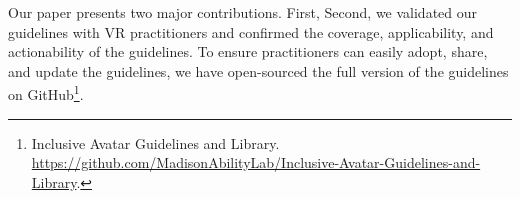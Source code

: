Our paper presents two major contributions. First,  %
Second, we validated  our guidelines with VR practitioners and confirmed the coverage, applicability, and actionability of the guidelines. 
To ensure practitioners can easily adopt, share, and update the guidelines, we have open-sourced the full version of the guidelines on GitHub\footnote{Inclusive Avatar Guidelines and Library. \url{https://github.com/MadisonAbilityLab/Inclusive-Avatar-Guidelines-and-Library}.}. 












